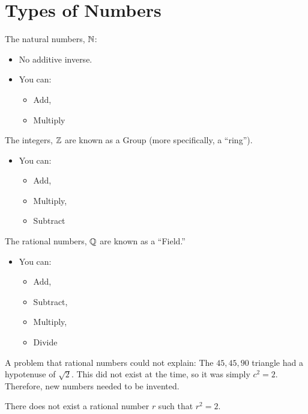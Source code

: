 \section{Types of Numbers}

The \gls{natural numbers}, $\mathbb{N}$:
\begin{itemize}
    \item No additive inverse.
    \item You can:
    \begin{itemize}
        \item Add,
        \item Multiply
    \end{itemize}
\end{itemize}

The \gls{integers}, $\mathbb{Z}$ are known as a Group (more specifically, a ``ring'').

\begin{itemize}
    \item You can:
    \begin{itemize}
        \item Add,
        \item Multiply,
        \item Subtract
    \end{itemize}
\end{itemize}

The \gls{rational numbers}, $\mathbb{Q}$ are known as a ``Field.''

\begin{itemize}
    \item You can:
    \begin{itemize}
        \item Add,
        \item Subtract,
        \item Multiply,
        \item Divide
    \end{itemize}
\end{itemize}

A problem that rational numbers could not explain: The $45, 45, 90$ triangle had a hypotenuse of $\sqrt{2}$. This did not exist at the time, so it was simply $c^2 = 2$. Therefore, new numbers needed to be invented.

\begin{theorem}
    There does not exist a rational number $r$ such that $r^2 = 2$.
\end{theorem}


